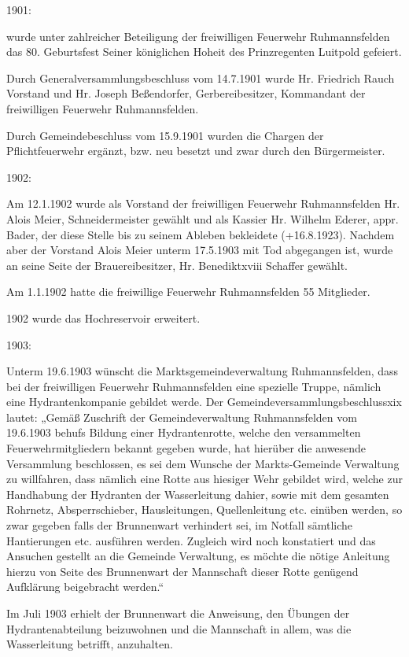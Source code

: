 1901:

wurde unter zahlreicher Beteiligung der freiwilligen Feuerwehr Ruhmannsfelden
das 80. Geburtsfest Seiner königlichen Hoheit des Prinzregenten Luitpold
gefeiert.

Durch Generalversammlungsbeschluss vom 14.7.1901 wurde Hr. Friedrich Rauch
Vorstand und Hr. Joseph Beßendorfer, Gerbereibesitzer, Kommandant der
freiwilligen Feuerwehr Ruhmannsfelden.

Durch Gemeindebeschluss vom 15.9.1901 wurden die Chargen der Pflichtfeuerwehr
ergänzt, bzw. neu besetzt und zwar durch den Bürgermeister.

1902:

Am 12.1.1902 wurde als Vorstand der freiwilligen Feuerwehr Ruhmannsfelden Hr.
Alois Meier, Schneidermeister gewählt und als Kassier Hr. Wilhelm Ederer, appr.
Bader, der diese Stelle bis zu seinem Ableben bekleidete (+16.8.1923). Nachdem
aber der Vorstand Alois Meier unterm 17.5.1903 mit Tod abgegangen ist, wurde an
seine Seite der Brauereibesitzer, Hr. Benediktxviii Schaffer gewählt.

Am 1.1.1902 hatte die freiwillige Feuerwehr Ruhmannsfelden 55 Mitglieder.

1902 wurde das Hochreservoir erweitert.

1903:

Unterm 19.6.1903 wünscht die Marktsgemeindeverwaltung Ruhmannsfelden, dass bei
der freiwilligen Feuerwehr Ruhmannsfelden eine spezielle Truppe, nämlich eine
Hydrantenkompanie gebildet werde. Der Gemeindeversammlungsbeschlussxix lautet:
„Gemäß Zuschrift der Gemeindeverwaltung Ruhmannsfelden vom 19.6.1903 behufs
Bildung einer Hydrantenrotte, welche den versammelten Feuerwehrmitgliedern
bekannt gegeben wurde, hat hierüber die anwesende Versammlung beschlossen, es
sei dem Wunsche der Markts-Gemeinde Verwaltung zu willfahren, dass nämlich eine
Rotte aus hiesiger Wehr gebildet wird, welche zur Handhabung der Hydranten der
Wasserleitung dahier, sowie mit dem gesamten Rohrnetz, Absperrschieber,
Hausleitungen, Quellenleitung etc. einüben werden, so zwar gegeben falls der
Brunnenwart verhindert sei, im Notfall sämtliche Hantierungen etc. ausführen
werden. Zugleich wird noch konstatiert und das Ansuchen gestellt an die Gemeinde
Verwaltung, es möchte die nötige Anleitung hierzu von Seite des Brunnenwart der
Mannschaft dieser Rotte genügend Aufklärung beigebracht werden.“

Im Juli 1903 erhielt der Brunnenwart die Anweisung, den Übungen der
Hydrantenabteilung beizuwohnen und die Mannschaft in allem, was die
Wasserleitung betrifft, anzuhalten.

